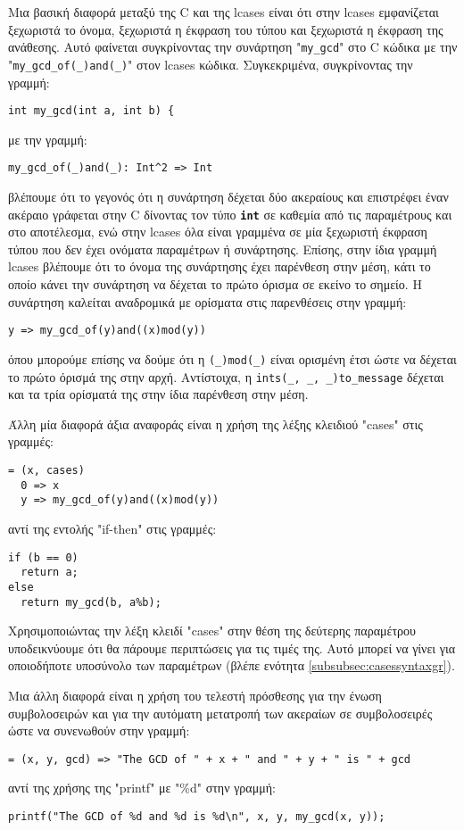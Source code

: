 \documentclass[diploma]{softlab-thesis}
\begin{document}
Μια βασική διαφορά μεταξύ της C και της lcases είναι ότι στην lcases
εμφανίζεται ξεχωριστά το όνομα, ξεχωριστά η έκφραση του τύπου και ξεχωριστά η
έκφραση της ανάθεσης. Αυτό φαίνεται συγκρίνοντας την συνάρτηση "\verb|my_gcd|"
στο C κώδικα με την "\verb|my_gcd_of(_)and(_)|" στον lcases κώδικα.
Συγκεκριμένα, συγκρίνοντας την γραμμή:
\begin{verbatim}
int my_gcd(int a, int b) {
\end{verbatim}
με την γραμμή:
\begin{verbatim}
my_gcd_of(_)and(_): Int^2 => Int
\end{verbatim}
βλέπουμε ότι το γεγονός ότι η συνάρτηση δέχεται δύο ακεραίους και επιστρέφει
έναν ακέραιο γράφεται στην C δίνοντας τον τύπο \textbf{\texttt{int}} σε καθεμία
από τις παραμέτρους και στο αποτέλεσμα, ενώ στην lcases όλα είναι γραμμένα
σε μία ξεχωριστή έκφραση τύπου που δεν έχει ονόματα παραμέτρων ή συνάρτησης.
Επίσης, στην ίδια γραμμή lcases βλέπουμε ότι το όνομα της συνάρτησης έχει
παρένθεση στην μέση, κάτι το οποίο κάνει την συνάρτηση να δέχεται το πρώτο
όρισμα σε εκείνο το σημείο. Η συνάρτηση καλείται αναδρομικά με ορίσματα στις
παρενθέσεις στην γραμμή:
\begin{verbatim}
y => my_gcd_of(y)and((x)mod(y))
\end{verbatim}
όπου μπορούμε επίσης να δούμε ότι η \verb|(_)mod(_)| είναι ορισμένη έτσι ώστε
να δέχεται το πρώτο όρισμά της στην αρχή. Αντίστοιχα, η
\verb|ints(_, _, _)to_message| δέχεται και τα τρία ορίσματά της στην ίδια
παρένθεση στην μέση.

Άλλη μία διαφορά άξια αναφοράς είναι η χρήση της λέξης κλειδιού "cases" στις
γραμμές:
\begin{verbatim}
= (x, cases)
  0 => x
  y => my_gcd_of(y)and((x)mod(y))
\end{verbatim}
αντί της εντολής "if-then" στις γραμμές:
\begin{verbatim}
if (b == 0)
  return a;
else
  return my_gcd(b, a%b);
\end{verbatim}
Χρησιμοποιώντας την λέξη κλειδί "cases" στην θέση της δεύτερης παραμέτρου
υποδεικνύουμε ότι θα πάρουμε περιπτώσεις για τις τιμές της. Αυτό μπορεί να
γίνει για οποιοδήποτε υποσύνολο των παραμέτρων (βλέπε ενότητα
\ref{subsubsec:casessyntaxgr}).

Μια άλλη διαφορά είναι η χρήση του τελεστή πρόσθεσης για την ένωση
συμβολοσειρών και για την αυτόματη μετατροπή των ακεραίων σε συμβολοσειρές
ώστε να συνενωθούν στην γραμμή:
\begin{verbatim}
= (x, y, gcd) => "The GCD of " + x + " and " + y + " is " + gcd
\end{verbatim}
αντί της χρήσης της "printf" με "\%d" στην γραμμή:
\begin{verbatim}
printf("The GCD of %d and %d is %d\n", x, y, my_gcd(x, y));
\end{verbatim}
\end{document}
